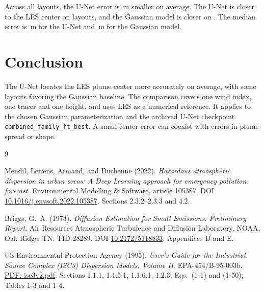 \documentclass{article}
\begin{document}
Across all \NScenes{} layouts, the U-Net error is \MeanDiff\,m smaller
on average. The U-Net is closer to the LES center on \NPositive{}
layouts, and the Gaussian model is closer on \NNegative{}. The median
error is \MedianDL\,m for the U-Net and \MedianGauss\,m for the
Gaussian model.

\section{Conclusion}
\label{sec:conclusion}

The U-Net locates the LES plume center more accurately on average, with
some layouts favoring the Gaussian baseline. The comparison covers one wind
index, one tracer and one height, and uses LES as a numerical reference. It
applies to the chosen Gaussian parameterization and the archived U-Net
checkpoint \texttt{combined\_family\_ft\_best}. A small center error can
coexist with errors in plume spread or shape.

\clearpage
\begin{thebibliography}{9}

Mendil, Leirens, Armand, and Duchenne (2022).
\emph{Hazardous atmospheric dispersion in urban areas: A Deep Learning
approach for emergency pollution forecast}. Environmental Modelling \&
Software, article 105387. DOI
\href{https://doi.org/10.1016/j.envsoft.2022.105387}{10.1016/j.envsoft.2022.105387}.
Sections 2.3.2--2.3.3 and 4.2.

Briggs, G.~A. (1973).
\emph{Diffusion Estimation for Small Emissions. Preliminary Report}.
Air Resources Atmospheric Turbulence and Diffusion Laboratory, NOAA,
Oak Ridge, TN. TID-28289. DOI
\href{https://doi.org/10.2172/5118833}{10.2172/5118833}.
Appendices D and E.

US Environmental Protection Agency (1995).
\emph{User's Guide for the Industrial Source Complex (ISC3) Dispersion Models,
Volume II}. EPA-454/B-95-003b.
\href{https://gaftp.epa.gov/AIR/aqmg/SCRAM/models/other/isc3/isc3v2.pdf}{PDF:
isc3v2.pdf}.
Sections 1.1.1, 1.1.5.1, 1.1.6.1, 1.2.3; Eqs.~(1-1) and (1-50);
Tables 1-3 and 1-4.

\end{thebibliography}
\end{document}
